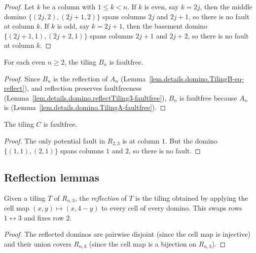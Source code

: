 \begin{proof}
\leanok
Let $k$ be a column with $1 \le k < n$.
If $k$ is even, say $k = 2j$, then the middle domino
$\{(2j, 2), (2j+1, 2)\}$ spans columns $2j$ and $2j+1$,
so there is no fault at column $k$.
If $k$ is odd, say $k = 2j+1$, then the basement domino
$\{(2j+1, 1), (2j+2, 1)\}$ spans columns $2j+1$ and $2j+2$,
so there is no fault at column $k$.
\end{proof}

\begin{lemma}
\label{lem.details.domino.TilingB-faultfree}
\leanhelper
\leanok
For each even $n \ge 2$, the tiling $B_n$ is faultfree.
\end{lemma}

\begin{proof}
\leanok
Since $B_n$ is the reflection of $A_n$
(Lemma~\ref{lem.details.domino.TilingB-eq-reflect}), and reflection preserves
faultfreeness (Lemma~\ref{lem.details.domino.reflectTiling3-faultfree}),
$B_n$ is faultfree because $A_n$ is (Lemma~\ref{lem.details.domino.TilingA-faultfree}).
\end{proof}

\begin{lemma}
\label{lem.details.domino.TilingC-faultfree}
\leanhelper
\leanok
The tiling $C$ is faultfree.
\end{lemma}

\begin{proof}
\leanok
The only potential fault in $R_{2,3}$ is at column $1$. But the domino
$\{(1,1),(2,1)\}$ spans columns $1$ and $2$, so there is no fault.
\end{proof}

\subsection{Reflection lemmas}

\begin{definition}
\label{def.details.domino.reflectTiling3}
\leanhelper
\leanok
Given a tiling $T$ of $R_{n,3}$, the \emph{reflection} of $T$ is the tiling
obtained by applying the cell map $(x, y) \mapsto (x, 4 - y)$ to every cell
of every domino. This swaps rows $1 \leftrightarrow 3$ and fixes row $2$.
\end{definition}

\begin{proof}
\leanok
The reflected dominos are pairwise disjoint (since the cell map is injective)
and their union covers $R_{n,3}$ (since the cell map is a bijection on
$R_{n,3}$).
\end{proof}

